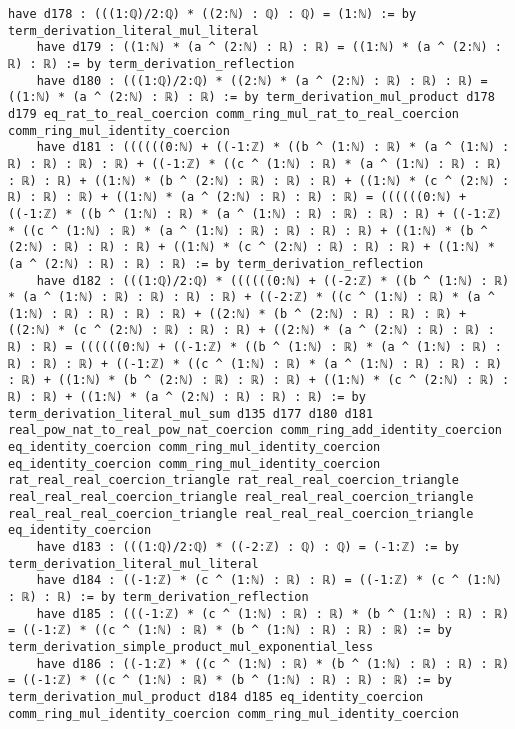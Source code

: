 \documentclass{article}
\begin{document}
\begin{tcolorbox}[colback=white!10, width=\linewidth]
\begin{lstlisting}[language=Lean4]
    have d178 : (((1:ℚ)/2:ℚ) * ((2:ℕ) : ℚ) : ℚ) = (1:ℕ) := by term_derivation_literal_mul_literal
    have d179 : ((1:ℕ) * (a ^ (2:ℕ) : ℝ) : ℝ) = ((1:ℕ) * (a ^ (2:ℕ) : ℝ) : ℝ) := by term_derivation_reflection
    have d180 : (((1:ℚ)/2:ℚ) * ((2:ℕ) * (a ^ (2:ℕ) : ℝ) : ℝ) : ℝ) = ((1:ℕ) * (a ^ (2:ℕ) : ℝ) : ℝ) := by term_derivation_mul_product d178 d179 eq_rat_to_real_coercion comm_ring_mul_rat_to_real_coercion comm_ring_mul_identity_coercion
    have d181 : ((((((0:ℕ) + ((-1:ℤ) * ((b ^ (1:ℕ) : ℝ) * (a ^ (1:ℕ) : ℝ) : ℝ) : ℝ) : ℝ) + ((-1:ℤ) * ((c ^ (1:ℕ) : ℝ) * (a ^ (1:ℕ) : ℝ) : ℝ) : ℝ) : ℝ) + ((1:ℕ) * (b ^ (2:ℕ) : ℝ) : ℝ) : ℝ) + ((1:ℕ) * (c ^ (2:ℕ) : ℝ) : ℝ) : ℝ) + ((1:ℕ) * (a ^ (2:ℕ) : ℝ) : ℝ) : ℝ) = ((((((0:ℕ) + ((-1:ℤ) * ((b ^ (1:ℕ) : ℝ) * (a ^ (1:ℕ) : ℝ) : ℝ) : ℝ) : ℝ) + ((-1:ℤ) * ((c ^ (1:ℕ) : ℝ) * (a ^ (1:ℕ) : ℝ) : ℝ) : ℝ) : ℝ) + ((1:ℕ) * (b ^ (2:ℕ) : ℝ) : ℝ) : ℝ) + ((1:ℕ) * (c ^ (2:ℕ) : ℝ) : ℝ) : ℝ) + ((1:ℕ) * (a ^ (2:ℕ) : ℝ) : ℝ) : ℝ) := by term_derivation_reflection
    have d182 : (((1:ℚ)/2:ℚ) * ((((((0:ℕ) + ((-2:ℤ) * ((b ^ (1:ℕ) : ℝ) * (a ^ (1:ℕ) : ℝ) : ℝ) : ℝ) : ℝ) + ((-2:ℤ) * ((c ^ (1:ℕ) : ℝ) * (a ^ (1:ℕ) : ℝ) : ℝ) : ℝ) : ℝ) + ((2:ℕ) * (b ^ (2:ℕ) : ℝ) : ℝ) : ℝ) + ((2:ℕ) * (c ^ (2:ℕ) : ℝ) : ℝ) : ℝ) + ((2:ℕ) * (a ^ (2:ℕ) : ℝ) : ℝ) : ℝ) : ℝ) = ((((((0:ℕ) + ((-1:ℤ) * ((b ^ (1:ℕ) : ℝ) * (a ^ (1:ℕ) : ℝ) : ℝ) : ℝ) : ℝ) + ((-1:ℤ) * ((c ^ (1:ℕ) : ℝ) * (a ^ (1:ℕ) : ℝ) : ℝ) : ℝ) : ℝ) + ((1:ℕ) * (b ^ (2:ℕ) : ℝ) : ℝ) : ℝ) + ((1:ℕ) * (c ^ (2:ℕ) : ℝ) : ℝ) : ℝ) + ((1:ℕ) * (a ^ (2:ℕ) : ℝ) : ℝ) : ℝ) := by term_derivation_literal_mul_sum d135 d177 d180 d181 real_pow_nat_to_real_pow_nat_coercion comm_ring_add_identity_coercion eq_identity_coercion comm_ring_mul_identity_coercion eq_identity_coercion comm_ring_mul_identity_coercion rat_real_real_coercion_triangle rat_real_real_coercion_triangle real_real_real_coercion_triangle real_real_real_coercion_triangle real_real_real_coercion_triangle real_real_real_coercion_triangle eq_identity_coercion
    have d183 : (((1:ℚ)/2:ℚ) * ((-2:ℤ) : ℚ) : ℚ) = (-1:ℤ) := by term_derivation_literal_mul_literal
    have d184 : ((-1:ℤ) * (c ^ (1:ℕ) : ℝ) : ℝ) = ((-1:ℤ) * (c ^ (1:ℕ) : ℝ) : ℝ) := by term_derivation_reflection
    have d185 : (((-1:ℤ) * (c ^ (1:ℕ) : ℝ) : ℝ) * (b ^ (1:ℕ) : ℝ) : ℝ) = ((-1:ℤ) * ((c ^ (1:ℕ) : ℝ) * (b ^ (1:ℕ) : ℝ) : ℝ) : ℝ) := by term_derivation_simple_product_mul_exponential_less
    have d186 : ((-1:ℤ) * ((c ^ (1:ℕ) : ℝ) * (b ^ (1:ℕ) : ℝ) : ℝ) : ℝ) = ((-1:ℤ) * ((c ^ (1:ℕ) : ℝ) * (b ^ (1:ℕ) : ℝ) : ℝ) : ℝ) := by term_derivation_mul_product d184 d185 eq_identity_coercion comm_ring_mul_identity_coercion comm_ring_mul_identity_coercion

\end{lstlisting}
\end{tcolorbox}
\end{document}
